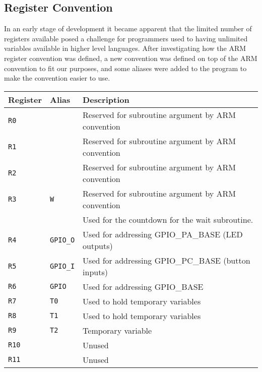 \subsection{Register Convention}

In an early stage of development it became apparent that the limited number of registers available posed a challenge for programmers used to having unlimited variables available in higher level languages.
After investigating how the ARM register convention was defined, a new convention was defined on top of the ARM convention to fit our purposes, and some aliases were added to the program to make the convention easier to use.

\begin{table}[h!]
    \label{tbl:register-convention} 
    \begin{tabular}{l | l | l}
        Register        & Alias            & Description                                        \\
        \hline
        \texttt{R0}     & ~                & Reserved for subroutine argument by ARM convention	\\
        \texttt{R1}     & ~                & Reserved for subroutine argument by ARM convention	\\
        \texttt{R2}     & ~                & Reserved for subroutine argument by ARM convention	\\
        \texttt{R3}     & \texttt{W}       & Reserved for subroutine argument by ARM convention	\\
        ~               & ~                & Used for the countdown for the wait subroutine.	\\
        \texttt{R4}     & \texttt{GPIO\_O} & Used for addressing GPIO\_PA\_BASE (LED outputs)	\\
        \texttt{R5}     & \texttt{GPIO\_I} & Used for addressing GPIO\_PC\_BASE (button inputs)	\\
        \texttt{R6}     & \texttt{GPIO}    & Used for addressing GPIO\_BASE			\\
        \texttt{R7}     & \texttt{T0}      & Used to hold temporary variables			\\
        \texttt{R8}     & \texttt{T1}      & Used to hold temporary variables			\\
        \texttt{R9}     & \texttt{T2}      & Temporary variable					\\
        \texttt{R10}    & ~                & Unused						\\
        \texttt{R11}    & ~                & Unused						\\

\end{tabular}
\end{table}
